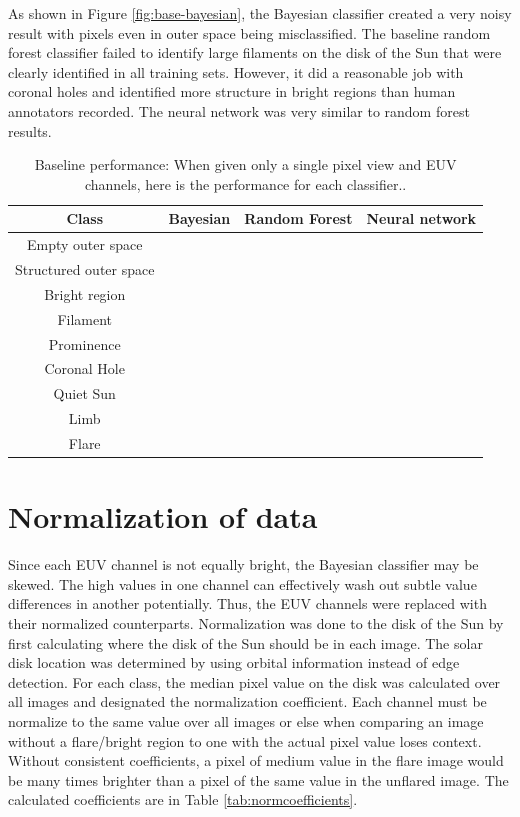 \documentclass[twoside]{report}
\begin{document}
As shown in Figure \ref{fig:base-bayesian}, the Bayesian classifier created a very noisy result with pixels even in outer space being misclassified. The baseline random forest classifier failed to identify large filaments on the disk of the Sun that were clearly identified in all training sets. However, it did a reasonable job with coronal holes and identified more structure in bright regions than human annotators recorded. The neural network was very similar to random forest results. 

\begin{table}[ht!]
\centering
 \begin{tabular}{|c | c c c|} 
 \hline
 Class & Bayesian & Random Forest & Neural network\\
   \hline\hline
Empty outer space & & &  \\
Structured outer space & & & \\
Bright region & & &\\
Filament & & & \\
Prominence & & &  \\
Coronal Hole & & &  \\
Quiet Sun & & & \\
Limb & & &  \\
Flare & & &  \\
 \hline
 \end{tabular}
 \caption{Baseline performance: When given only a single pixel view and EUV channels, here is the performance for each classifier..}
 \label{tab:baselinemetric}
\end{table}

\section{Normalization of data}
Since each EUV channel is not equally bright, the Bayesian classifier may be skewed. The high values in one channel can effectively wash out subtle value differences in another potentially. Thus, the EUV channels were replaced with their normalized counterparts. Normalization was done to the disk of the Sun by first calculating where the disk of the Sun should be in each image. The solar disk location was determined by using orbital information instead of edge detection. For each class, the median pixel value on the disk was calculated over all images and designated the normalization coefficient. Each channel must be normalize to the same value over all images or else when comparing an image without a flare/bright region to one with the actual pixel value loses context. Without consistent coefficients, a pixel of medium value in the flare image would be many times brighter than a pixel of the same value in the unflared image. The calculated coefficients are in Table \ref{tab:normcoefficients}. 
\end{document}
